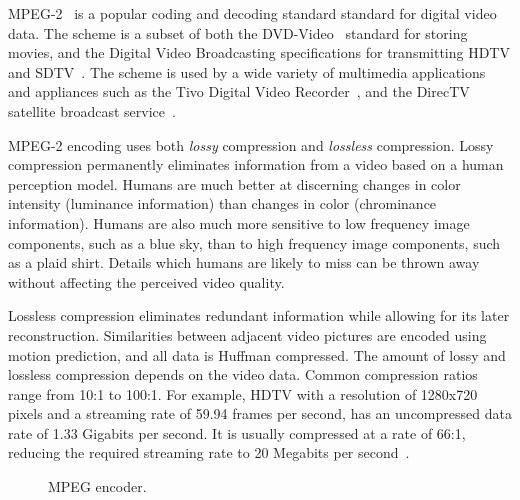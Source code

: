 
MPEG-2~\cite{MPEG2} is a popular coding and decoding standard standard
for digital video data. The scheme is a subset of both the
DVD-Video~\cite{DVDVideo} standard for storing movies, and the Digital
Video Broadcasting specifications for transmitting HDTV and
SDTV~\cite{DVB}. The scheme is used by a wide variety of multimedia
applications and appliances such as the Tivo Digital Video
Recorder~\cite{tivo}, and the DirecTV satellite broadcast
service~\cite{directv}.

MPEG-2 encoding uses both {\it lossy} compression and {\it lossless}
compression. Lossy compression permanently eliminates information from
a video based on a human perception model. Humans are much better at
discerning changes in color intensity (luminance information) than
changes in color (chrominance information). Humans are also much more
sensitive to low frequency image components, such as a blue sky, than
to high frequency image components, such as a plaid shirt. Details
which humans are likely to miss can be thrown away without affecting
the perceived video quality.

Lossless compression eliminates redundant information while allowing
for its later reconstruction. Similarities between adjacent video
pictures are encoded using motion prediction, and all data is Huffman
compressed\cite{Huffman52}. The amount of lossy and lossless
compression depends on the video data. Common compression ratios range
from 10:1 to 100:1. For example, HDTV with a resolution of 1280x720
pixels and a streaming rate of 59.94 frames per second, has an
uncompressed data rate of 1.33 Gigabits per second. It is usually
compressed at a rate of 66:1, reducing the required streaming rate to
20 Megabits per second~\cite{imagevidstandards, Page 3}.


\begin{figure}[t]
\begin{center}
\vspace{-12pt}
 \caption{MPEG encoder.}
 \label{fig:mpeg-encoder}
\end{center}
\end{figure}

